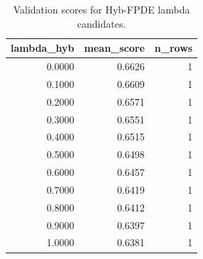 \begin{table}[t]
\caption{Validation scores for Hyb-FPDE lambda candidates.}
\label{tab:lambda_distribution_computed}
\centering
\begin{tabular}{rrr}
\toprule
lambda\_hyb & mean\_score & n\_rows \\
\midrule
0.0000 & 0.6626 & 1 \\
0.1000 & 0.6609 & 1 \\
0.2000 & 0.6571 & 1 \\
0.3000 & 0.6551 & 1 \\
0.4000 & 0.6515 & 1 \\
0.5000 & 0.6498 & 1 \\
0.6000 & 0.6457 & 1 \\
0.7000 & 0.6419 & 1 \\
0.8000 & 0.6412 & 1 \\
0.9000 & 0.6397 & 1 \\
1.0000 & 0.6381 & 1 \\
\bottomrule
\end{tabular}

\end{table}
